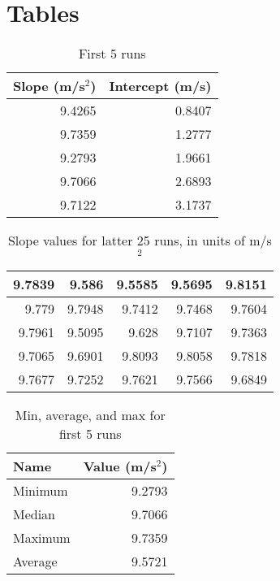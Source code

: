 \section{Tables}
\begin{table}[ht]
    \centering
    \begin{tabular}{|r|r|}
        \hline
        Slope (m/s$^{2}$) & Intercept (m/s) \\
        \hline
        9.4265 & 0.8407 \\
        9.7359 & 1.2777 \\
        9.2793 & 1.9661 \\
        9.7066 & 2.6893 \\
        9.7122 & 3.1737 \\
        \hline
    \end{tabular}
    \caption{First 5 runs}
    \label{table:01.first.5}
\end{table}
\begin{table}[ht]
    \centering
    \begin{tabular}{|r|r|r|r|r|}
        \hline
        9.7839 & 9.586 & 9.5585 & 9.5695 & 9.8151 \\
        \hline
        9.779 & 9.7948 & 9.7412 & 9.7468 & 9.7604 \\
        \hline
        9.7961 & 9.5095 & 9.628 & 9.7107 & 9.7363 \\
        \hline
        9.7065 & 9.6901 & 9.8093 & 9.8058 & 9.7818 \\
        \hline
        9.7677 & 9.7252 & 9.7621 & 9.7566 & 9.6849 \\
        \hline
    \end{tabular}
    \caption{Slope values for latter 25 runs, in units of m/s$^{2}$}
    \label{table:01.latter.25}
\end{table}
\begin{table}[ht]
    \centering
    \begin{tabular}{|l|r|}
        \hline
        Name & Value (m/s$^{2}$) \\
        \hline
        Minimum & 9.2793 \\
        Median & 9.7066 \\
        Maximum & 9.7359 \\
        Average & 9.5721 \\
        \hline
    \end{tabular}
    \caption{Min, average, and max for first 5 runs}
    \label{table:01.describe.5}
\end{table}
